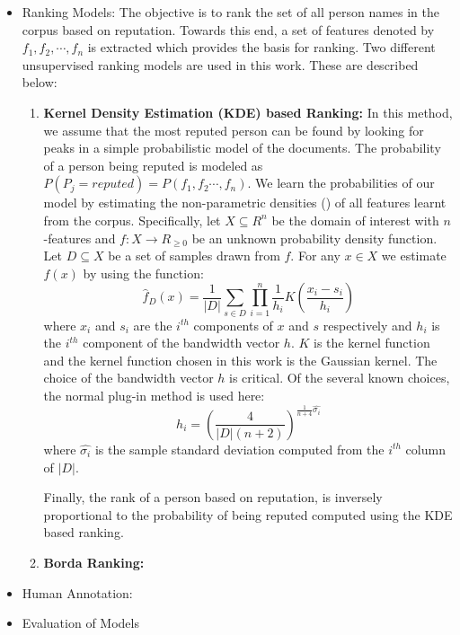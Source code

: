 \documentclass[a4paper,man,natbib]{apa6}
\begin{document}
\begin{itemize}
\item{Ranking Models: }
The objective is to rank the set of all person names in the corpus based on reputation. Towards this end, a set of features denoted by $f_1,f_2, \cdots, f_n$ is extracted which provides the basis for ranking. Two different unsupervised ranking models are used in this work. These are described below:
\begin{enumerate}
\item \textbf{Kernel Density Estimation (KDE) based Ranking: } In this method, we assume that the most reputed person can be found by looking for peaks in a simple probabilistic model of the documents. The probability of a person being reputed is modeled as $P(P_j = reputed) = P(f_1,f_2 \cdots, f_n)$. We learn the probabilities of our model by estimating the non-parametric densities (\cite{scott_multivariate_2015, Silverman86}) of all features learnt from the corpus. Specifically, let $X \subseteq R^n$ be the domain of interest with $n$-features and $f: X \rightarrow R_{\ge 0}$ be an unknown probability density function. Let $D \subseteq X$ be a set of samples drawn from $f$. For any $x \in X$ we estimate $f(x)$ by using the function:
\begin{equation}
\label{eqn1}
\hat{f}_D(x) = \frac{1}{|D|} \sum_{s \in D} \prod_{i=1}^{n} \frac{1}{h_i} K(\frac{x_i - s_i}{h_i})
\end{equation}
where $x_i$ and $s_i$ are the $i^{th}$ components of $x$ and $s$ respectively and $h_i$ is the $i^{th}$ component of the bandwidth vector $h$. $K$ is the kernel function and the kernel function chosen in this work is the Gaussian kernel. The choice of the bandwidth vector $h$ is critical. Of the several known choices, the normal plug-in method is used here:
\begin{equation}
\label{eqn2}
h_i = (\frac{4}{|D| (n+2)})^{\frac{1}{n+4} \hat{\sigma_i}}
\end{equation}
where $ \hat{\sigma_i}$ is the sample standard deviation computed from the $i^{th}$ column of $|D|$.

Finally, the rank of a person based on reputation, is inversely proportional to the probability of being reputed computed using the KDE based ranking.  
 \item \textbf{Borda Ranking: } 
\end{enumerate}

\item {Human Annotation: }

\item{Evaluation of Models}

\end{itemize}
\end{document}
